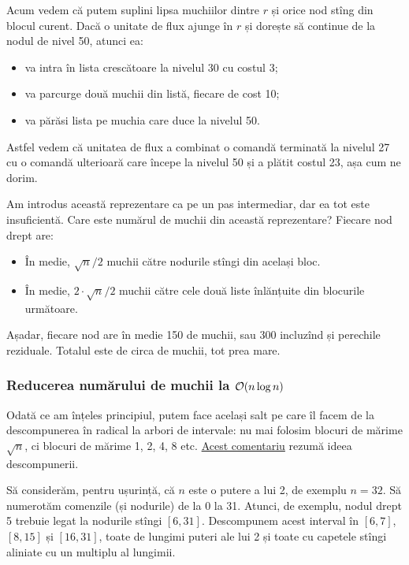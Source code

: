 \documentclass[../main.tex]{subfiles}
\begin{document}
Acum vedem că putem suplini lipsa muchiilor dintre $r$ și orice nod stîng din blocul curent. Dacă o unitate de flux ajunge în $r$ și dorește să continue de la nodul de nivel 50, atunci ea:

\begin{itemize}
  \item va intra în lista crescătoare la nivelul 30 cu costul 3;
  \item va parcurge două muchii din listă, fiecare de cost 10;
  \item va părăsi lista pe muchia care duce la nivelul 50.
\end{itemize}

Astfel vedem că unitatea de flux a combinat o comandă terminată la nivelul 27 cu o comandă ulterioară care începe la nivelul 50 și a plătit costul 23, așa cum ne dorim.

Am introdus această reprezentare ca pe un pas intermediar, dar ea tot este insuficientă. Care este numărul de muchii din această reprezentare? Fiecare nod drept are:

\begin{itemize}
  \item În medie, $\sqrt{n} / 2$ muchii către nodurile stîngi din același bloc.
  \item În medie, $2 \cdot \sqrt{n} / 2$ muchii către cele două liste înlănțuite din blocurile următoare.
\end{itemize}

Așadar, fiecare nod are în medie 150 de muchii, sau 300 incluzînd și perechile reziduale. Totalul este de circa  de muchii, tot prea mare.


\subsubsection*{Reducerea numărului de muchii la \texorpdfstring{$\mathcal{O}(n \log n)$}{n log n}}

Odată ce am înțeles principiul, putem face același salt pe care îl facem de la descompunerea în radical la arbori de intervale: nu mai folosim blocuri de mărime $\sqrt{n}$, ci blocuri de mărime 1, 2, 4, 8 etc. \href{https://codeforces.com/blog/entry/109545#comment-976617}{Acest comentariu} rezumă ideea descompunerii.

Să considerăm, pentru ușurință, că $n$ este o putere a lui 2, de exemplu $n = 32$. Să numerotăm comenzile (și nodurile) de la 0 la 31. Atunci, de exemplu, nodul drept 5 trebuie legat la nodurile stîngi $[6, 31]$. Descompunem acest interval în $[6,7]$, $[8,15]$ și $[16,31]$, toate de lungimi puteri ale lui 2 și toate cu capetele stîngi aliniate cu un multiplu al lungimii.
\end{document}
